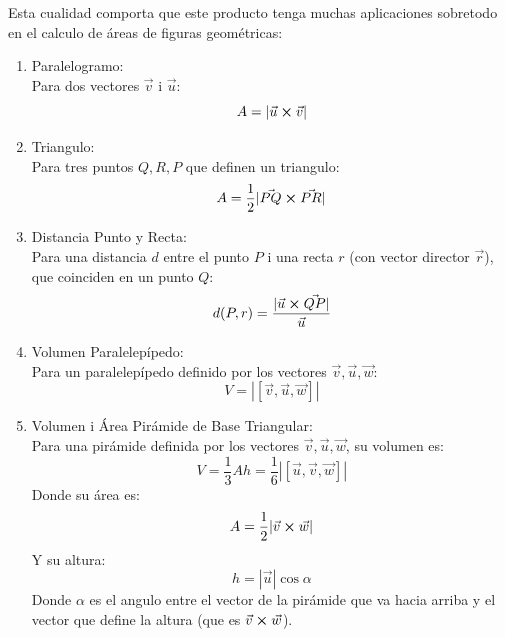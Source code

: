 \documentclass[arial,a4paper,print]{article}
\begin{document}
Esta cualidad comporta que este producto tenga muchas aplicaciones sobretodo en el calculo de áreas de figuras geométricas:
\begin{enumerate}
	\item Paralelogramo: \\
	Para dos vectores $\vec{v}$ i $\vec{u}$:
\begin{equation*}
	A = |\vec{u}\cross\vec{v}|
\end{equation*}

	\item Triangulo: \\
	Para tres puntos $Q, R, P$ que definen un triangulo:
\begin{equation*}
	A = \frac12 |\vec{PQ}\cross\vec{PR}|
\end{equation*}

	\item Distancia Punto y Recta: \\
	Para una distancia $d$ entre el punto $P$ i una recta $r$ (con vector director $\vec{r}$), que coinciden en un punto $Q$:
\begin{equation*}
	d(P, r) = \frac{|\vec{u}\cross\vec{QP}|}{\vec{u}}
\end{equation*}

	\item Volumen Paralelepípedo: \\
	Para un paralelepípedo definido por los vectores $\vec{v}, \vec{u}, \vec{w}$:
\begin{equation*}
	V = |[\vec{v}, \vec{u}, \vec{w}]|
\end{equation*}

	\item Volumen i Área Pirámide de Base Triangular: \\
	Para una pirámide definida por los vectores  $\vec{v}, \vec{u}, \vec{w}$, su volumen es:
\begin{equation*}
	V = \frac13 Ah = \frac16|[\vec{u}, \vec{v}, \vec{w}]|
\end{equation*}
Donde su área es:
\begin{equation*}
	A = \frac12|\vec{v}\cross\vec{w}|
\end{equation*}
Y su altura:
\begin{equation*}
	h = |\vec{u}|\cos \alpha
\end{equation*}
Donde $\alpha$ es el angulo entre el vector de la pirámide que va hacia arriba y el vector que define la altura (que es $\vec{v}\cross\vec{w}$). 

\end{enumerate} 
\end{document}
